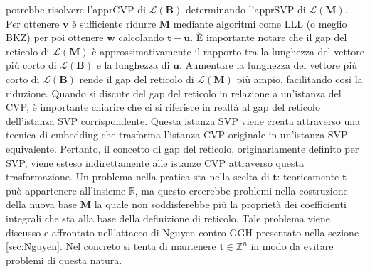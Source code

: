 potrebbe risolvere l'apprCVP di $\mathcal{L(\mathbf{B})}$ determinando l'apprSVP di $\mathcal{L}(\mathbf{M})$.
Per ottenere $\mathbf{v}$ è sufficiente ridurre $\mathbf{M}$
mediante algoritmi come LLL (o meglio BKZ) per poi ottenere $\mathbf{w}$ calcolando 
$\mathbf{t}-\mathbf{u}$.
È importante notare che il gap del reticolo di $\mathcal{L}(\mathbf{M})$ è approssimativamente il 
rapporto tra la lunghezza del vettore più corto di $\mathcal{L}(\mathbf{B})$ e la lunghezza 
di $\mathbf{u}$. Aumentare la lunghezza del vettore più corto di 
$\mathcal{L}(\mathbf{B})$ rende il gap del reticolo di $\mathcal{L}(\mathbf{M})$ più ampio, 
facilitando così la riduzione.
Quando si discute del gap del reticolo in relazione a un'istanza del CVP, è 
importante chiarire che ci si riferisce in realtà al gap del reticolo dell'istanza SVP corrispondente. 
Questa istanza SVP viene creata attraverso una tecnica di embedding che trasforma l'istanza 
CVP originale in un'istanza SVP equivalente. Pertanto, il concetto di gap del reticolo, 
originariamente definito per SVP, viene esteso indirettamente alle istanze CVP attraverso 
questa trasformazione.
Un problema nella pratica sta nella scelta di $\mathbf{t}$: teoricamente
$\mathbf{t}$ può appartenere all'insieme $\mathbb{R}$, ma questo creerebbe problemi nella
costruzione della nuova base $\mathbf{M}$ la quale non soddisferebbe più la proprietà dei 
coefficienti integrali che sta alla base della definizione di reticolo. Tale problema viene
discusso e affrontato nell'attacco di Nguyen contro GGH presentato nella sezione \ref{sec:Nguyen}.
Nel concreto si tenta di mantenere $\mathbf{t} \in \mathbb{Z}^n$ in modo da evitare problemi
di questa natura.


